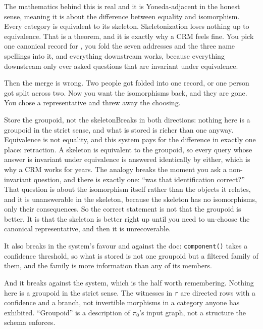 The mathematics behind this is real and it is Yoneda-adjacent in the honest sense, meaning it is about the difference between equality and isomorphism. Every category is equivalent to its skeleton. Skeletonization loses nothing up to equivalence. That is a theorem, and it is exactly why a CRM feels fine. You pick one canonical record for \labPerson, you fold the seven addresses and the three name spellings into it, and everything downstream works, because everything downstream only ever asked questions that are invariant under equivalence.

Then the merge is wrong. Two people got folded into one record, or one person got split across two. Now you want the isomorphisms back, and they are gone. You chose a representative and threw away the choosing.

\begin{Analogy}{Store the groupoid, not the skeleton}{Breaks in both directions: nothing here is a groupoid in the strict sense, and what is stored is richer than one anyway.}
Equivalence is not equality, and this system pays for the difference in exactly one place: retraction. A skeleton is equivalent to the groupoid, so every query whose answer is invariant under equivalence is answered identically by either, which is why a CRM works for years. The analogy breaks the moment you ask a non-invariant question, and there is exactly one: ``was that identification correct?'' That question is about the isomorphism itself rather than the objects it relates, and it is unanswerable in the skeleton, because the skeleton has no isomorphisms, only their consequences. So the correct statement is not that the groupoid is better. It is that the skeleton is better right up until you need to un-choose the canonical representative, and then it is unrecoverable.

It also breaks in the system's favour and against the doc: \texttt{component()} takes a confidence threshold, so what is stored is not one groupoid but a filtered family of them, and the family is more information than any of its members.

And it breaks against the system, which is the half worth remembering. Nothing here is a groupoid in the strict sense. The witnesses in \texttt{r} are directed rows with a confidence and a branch, not invertible morphisms in a category anyone has exhibited. ``Groupoid'' is a description of $\pi_0$'s input graph, not a structure the schema enforces.
\end{Analogy}

